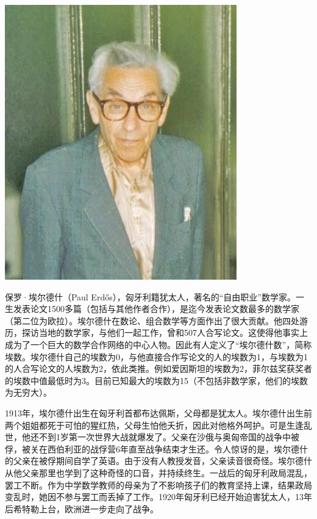 \documentclass[b5paper]{ctexart}
\begin{document}
\begin{mdframed}

\begin{center}
 \includegraphics[scale=0.3]{img/erdos-1992}
 \label{fig:erdos-1992}
\end{center}

保罗·埃尔德什（Paul Erdős），匈牙利籍犹太人，著名的“自由职业”数学家。一生发表论文1500多篇（包括与其他作者合作），是迄今发表论文数最多的数学家（第二位为欧拉）。埃尔德什在数论、组合数学等方面作出了很大贡献\cite{Hoffman-Paul-2025}。他四处游历，探访当地的数学家，与他们一起工作，曾和507人合写论文。这使得他事实上成为了一个巨大的数学合作网络的中心人物。因此有人定义了“埃尔德什数”，简称埃数。埃尔德什自己的埃数为0，与他直接合作写论文的人的埃数为1，与埃数为1的人合写论文的人埃数为2，依此类推。例如爱因斯坦的埃数为2，菲尔兹奖获奖者的埃数中值最低时为3。目前已知最大的埃数为15（不包括非数学家，他们的埃数为无穷大）。


1913年，埃尔德什出生在匈牙利首都布达佩斯，父母都是犹太人。埃尔德什出生前两个姐姐都死于可怕的猩红热，父母生怕他夭折，因此对他格外呵护。可是生逢乱世，他还不到1岁第一次世界大战就爆发了。父亲在沙俄与奥匈帝国的战争中被俘，被关在西伯利亚的战俘营6年直至战争结束才生还。令人惊讶的是，埃尔德什的父亲在被俘期间自学了英语。由于没有人教授发音，父亲读音很奇怪。埃尔德什从他父亲那里也学到了这种奇怪的口音，并持续终生。一战后的匈牙利政局混乱，罢工不断。作为中学数学教师的母亲为了不影响孩子们的教育坚持上课，结果政局变乱时，她因不参与罢工而丢掉了工作。1920年匈牙利已经开始迫害犹太人，13年后希特勒上台，欧洲进一步走向了战争。


\end{mdframed}
\end{document}
